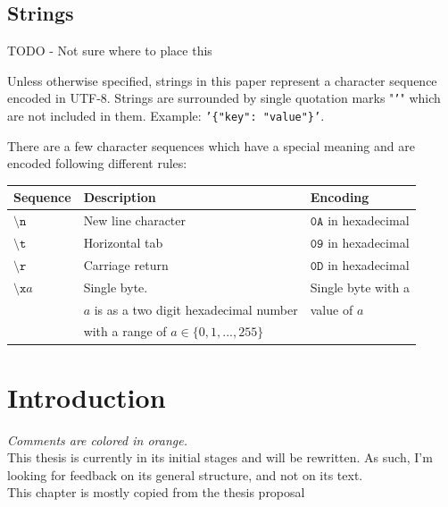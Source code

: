 \documentclass[english, 12pt, a4paper, sci, utf8, a-2b, online]{aaltothesis}
\def\note#1{\begin{flushleft}
	{\color{orange} \raggedright \textsf{#1}}
 \linebreak \noindent
\end{flushleft}}
\def\str#1{\texttt{'#1'}}
\begin{document}
\subsection*{Strings}
\note{TODO - Not sure where to place this}
Unless otherwise specified, strings in this paper represent a character sequence encoded in UTF-8. Strings are surrounded by single quotation marks "\texttt{'}" which are not included in them. Example: \str{\{"key": "value"\}}.

There are a few character sequences which have a special meaning and are encoded following different rules:

\vspace{8pt}

\begin{tabular}{lll}
	Sequence & Description & Encoding \\
	\hline
	$\texttt{\textbackslash n}$ & New line character & $\texttt{0A}$ in hexadecimal \\
	$\texttt{\textbackslash t}$ & Horizontal tab & $\texttt{09}$ in hexadecimal \\
	$\texttt{\textbackslash r}$ & Carriage return & $\texttt{0D}$ in hexadecimal \\
	$\texttt{\textbackslash x}a$ & Single byte. & Single byte with a \\
	 & $a$ is as a two digit hexadecimal number & value of $a$  \\
	 & with a range of $a \in \{0, 1, ..., 255\}$ & 
\end{tabular}



\cleardoublepage

\section{Introduction}
\note{\emph{Comments are colored in orange.} \\
This thesis is currently in its initial stages and will be rewritten. As such, I'm looking for feedback on its general structure, and not on its text. \\
This chapter is mostly copied from the thesis proposal}
\end{document}
